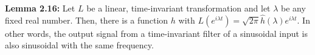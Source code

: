 {\bf Lemma 2.16:} Let $L$ be a linear, time-invariant transformation and let $\lambda$ be any fixed real number. Then, there is a function $h$ with $L(e^{i\lambda t})=\sqrt{2\pi}\hat{h}(\lambda)e^{i\lambda t}$. In other words, the output signal from a time-invariant filter of a sinusoidal input is also sinusoidal with the same frequency.